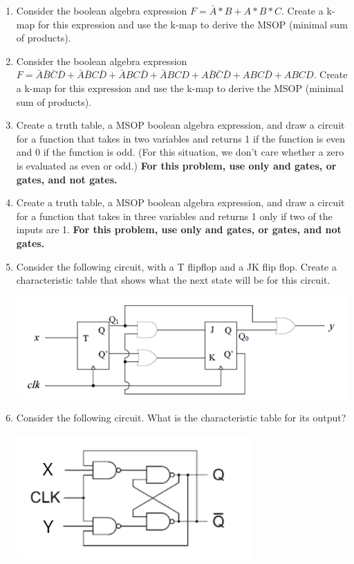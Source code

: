\documentclass[10pt]{article}
\begin{document}
\begin{itemize}
\begin{enumerate}
\item Consider the boolean algebra expression $F = \bar{A} *B + A*B*C$.  Create a k-map for this expression and use the k-map to derive the MSOP (minimal sum of products).

\item Consider the boolean algebra expression $F = \bar{A}\bar{B}\bar{C}\bar{D}+\bar{A}\bar{B}C\bar{D}+\bar{A}BC\bar{D}+\bar{A}BCD+A\bar{B}\bar{C}\bar{D}+ABC\bar{D}+ABCD$.  Create a k-map for this expression and use the k-map to derive the MSOP (minimal sum of products).

\item Create a truth table, a MSOP boolean algebra expression, and draw a circuit for a function that takes in two variables and returns 1 if the function is even and 0 if the function is odd.  (For this situation, we don't care whether a zero is evaluated as even or odd.) \textbf{For this problem, use only and gates, or gates, and not gates.}

\item Create a truth table, a MSOP boolean algebra expression, and draw a circuit for a function that takes in three variables and returns 1 only if two of the inputs are 1. \textbf{For this problem, use only and gates, or gates, and not gates.}

\item Consider the following circuit, with a T flipflop and a JK flip flop.  Create a characteristic table that shows what the next state will be for this circuit. 

\includegraphics[scale=.8]{ExampleFFProblem.png}

\item Consider the following circuit.  What is the characteristic table for its output?

\includegraphics[scale=.8]{FlipFlopBehaviourProblemWithLabels.png}


\end{enumerate}
\end{itemize}
\end{document}
